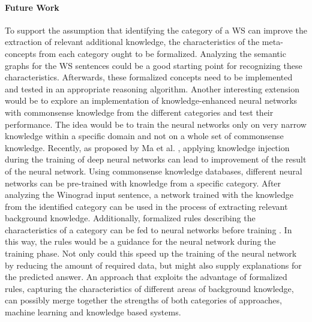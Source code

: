 \paragraph{Future Work}
To support the assumption that identifying the category of a WS can improve the extraction of relevant additional knowledge, the characteristics of the meta-concepts from each category ought to be formalized. Analyzing the semantic graphs for the WS sentences could be a good starting point for recognizing these characteristics. Afterwards, these formalized concepts need to be implemented and tested in an appropriate reasoning algorithm. 
Another interesting extension would be to explore an implementation of knowledge-enhanced neural networks with commonsense knowledge from the different categories and test their performance. The idea would be to train the neural networks only on very narrow knowledge within a specific domain and not on a whole set of commonsense knowledge. Recently, as proposed by Ma et al. \cite{DBLP:conf/aaai/MaPC18}, applying knowledge injection during the training of deep neural networks can lead to improvement of the result of the neural network. Using commonsense knowledge databases, different neural networks can be pre-trained with knowledge from a specific category. After analyzing the Winograd input sentence, a network trained with the knowledge from the identified category can be used in the process of extracting relevant background knowledge. 
Additionally, formalized rules describing the characteristics of a category can be fed to neural networks before training \cite{DBLP:conf/aaai/RoychowdhuryDG18}. In this way, the rules would be a guidance for the neural network during the training phase. Not only could this speed up the training of the neural network by reducing the amount of required data, but might also supply explanations for the predicted answer. An approach that exploits the advantage of formalized rules, capturing the characteristics of different areas of background knowledge, can possibly merge together the strengths of both categories of approaches, machine learning and knowledge based systems. 
 